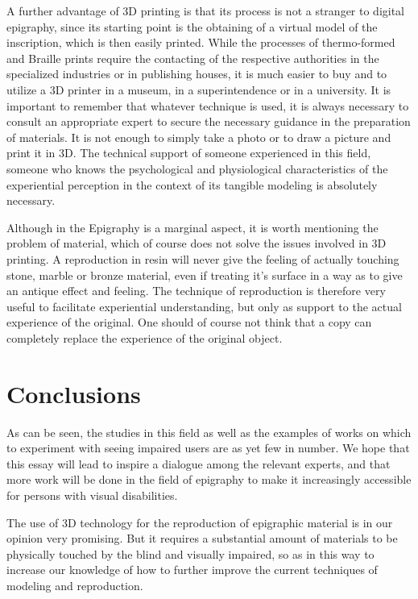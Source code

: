 \documentclass[amsthm,ebook]{saparticle}
\begin{document}
A further advantage of 3D printing is that its process is not a stranger to digital epigraphy, since its starting point
is the obtaining of a virtual model of the inscription, which is then easily printed. While the processes of
thermo-formed and Braille prints require the contacting of the respective authorities in the specialized industries or
in publishing houses, it is much easier to buy and to utilize a 3D printer in a museum, in a superintendence or in a
university. It is important to remember that whatever technique is used, it is always necessary to consult an
appropriate expert to secure the necessary guidance in the preparation of materials. It is not enough to simply take a
photo or to draw a picture and print it in 3D. The technical support of someone experienced in this field, someone who
knows the psychological and physiological characteristics of the experiential perception in the context of its tangible
modeling is absolutely necessary.

Although in the Epigraphy is a marginal aspect, it is worth mentioning the problem of material, which of course does not
solve the issues involved in 3D printing. A reproduction in resin will never give the feeling of actually touching
stone, marble or bronze material, even if treating it’s surface in a way as to give an antique effect and feeling. The
technique of reproduction is therefore very useful to facilitate experiential understanding, but only as support to the
actual experience of the original. One should of course not think that a copy can completely replace the experience of
the original object.







\section{Conclusions}
\noindent As can be seen, the studies in this field as well as the examples of works on which to experiment with seeing impaired
users are as yet few in number. We hope that this essay will lead to inspire a dialogue among the relevant experts, and
that more work will be done in the field of epigraphy to make it increasingly accessible for persons with visual
disabilities.

The use of 3D technology for the reproduction of epigraphic material is in our opinion very promising. But it requires a
substantial amount of materials to be physically touched by the blind and visually impaired, so as in this way to
increase our knowledge of how to further improve the current techniques of modeling and reproduction.

\nocite{accessibilità,Bellini2000,Cetorelli2004,Hersh2008,Jansson2003,Levi2015,Velestino2007}




\end{document}
